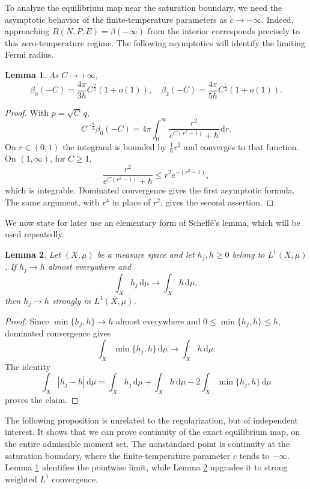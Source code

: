 \documentclass[10pt,reqno]{amsart}
\numberwithin{equation}{section}
\newtheorem{lemma}{Lemma}[section]
\theoremstyle{definition}
\newcommand{\dd}{\mathrm d}
\newcommand{\dr}{\mathrm{d}r}
\begin{document}
To analyze the equilibrium map near the saturation boundary, we need the asymptotic behavior of the finite-temperature parameters as $c\to-\infty$.  Indeed, approaching $B(N,P,E)=\beta(-\infty)$ from the interior corresponds precisely to this zero-temperature regime.  The following asymptotics will identify the limiting Fermi radius.

\begin{lemma}\label{lem:beta0-ze-t}
As $C\to+\infty$,
\[
 \beta_0(-C)=\frac{4\pi}{3\hbar}C^{\frac32}(1+o(1)), \quad \beta_2(-C)=\frac{4\pi}{5\hbar}C^{\frac52}(1+o(1)).
\]
\end{lemma}

\begin{proof}
With $p=\sqrt C\,q$,
\[
 C^{-\frac32}\beta_0(-C)  =4\pi\int_0^\infty\frac{r^2}{e^{C(r^2-1)}+\hbar}\,\dr.
\]
On $r\in(0,1)$ the integrand is bounded by $\frac1\hbar r^2$ and converges to that function.  On $(1,\infty)$, for $C\geq1$,
\[
 \frac{r^2}{e^{C(r^2-1)}+\hbar}  \leq r^2e^{-(r^2-1)},
\]
which is integrable.  Dominated convergence gives the first asymptotic formula.  The same argument, with $r^4$ in place of $r^2$, gives the second assertion.
\end{proof}

We now state for later use an elementary form of Scheff\'e's lemma, which will be used repeatedly.

\begin{lemma} \label{lem:pos-L1}
Let $(X,\mu)$ be a measure space and let $h_j,h\geq0$ belong to $L^1(X,\mu)$.  If $h_j\to h$ almost everywhere and
\[
 \int_X h_j\,\dd\mu \to \int_X h\,\dd\mu,
\]
then $h_j\to h$ strongly in $L^1(X,\mu)$.
\end{lemma}

\begin{proof}
Since $\min\{h_j,h\}\to h$ almost everywhere and $0\leq\min\{h_j,h\}\leq h$, dominated convergence gives
\[
 \int_X \min\{h_j,h\} \, \dd\mu \to \int_X h\,\dd\mu.
\]
The identity
\[
 \int_X |h_j-h|\,\dd\mu  =\int_X h_j\,\dd\mu+\int_X h\,\dd\mu  -2\int_X \min\{h_j,h\}\,\dd\mu
\]
proves the claim.
\end{proof}


The following proposition is unrelated to the regularization, but of independent interest. It shows that we can prove continuity of the exact equilibrium map, on the entire admissible moment set. The nonstandard point is continuity at the saturation boundary, where the finite-temperature parameter $c$ tends to $-\infty$. Lemma \ref{lem:beta0-ze-t} identifies the pointwise limit, while Lemma \ref{lem:pos-L1} upgrades it to strong weighted $L^1$ convergence.
\end{document}
